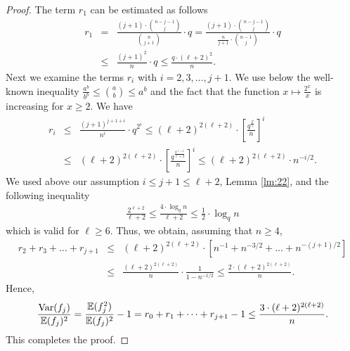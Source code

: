 \documentclass[11pt,twoside, reqno]{amsart}
\theoremstyle{plain}
\theoremstyle{definition}
\newcommand{\E}{\mathbb{E}}
\begin{document}
\begin{proof}
The term $r_1$ can be estimated as follows
\begin{eqnarray*}\label{eq:r1}
r_1&=& \frac{(j+1)\cdot \binom {n-j -1}{j}}{\binom n {j+1} } \cdot q = \frac{(j+1)\cdot \binom {n-j -1}{j}}{\frac{n}{j+1} \cdot \binom {n-1} j  }\cdot q \nonumber \\
&\le & \frac{(j+1)^{2}}{n}\cdot q\le \frac{q\cdot (\ell+2)^{2}}{n}.
\end{eqnarray*}
Next we examine the terms $r_i$ with $i=2, 3, \dots, j+1$. 
We use below the well-known inequality
$
\frac{a^b}{b^b}\le \binom a b\le a^b
$
and the fact that the function $x\mapsto \frac{2^x}{x}$ is increasing for $x\ge 2$. We have
\begin{eqnarray*}
r_i&\le& \frac{(j+1)^{j+1+i}}{n^i}\cdot q^{2^i}
\le (\ell+2)^{2(\ell+2)}\cdot \left[\frac{q^{\frac{2^i}{i}}}{n}\right]^i \\
&\le & (\ell+2)^{2(\ell+2)}\cdot \left[\frac{q^{\frac{2^{\ell+2}}{\ell+2}}}{n}\right]^i 
\le  
(\ell+2)^{2(\ell+2)}\cdot n^{-i/2}.
\end{eqnarray*}
We used above our assumption $i\le j+1\le \ell+2$, Lemma \ref{lm:22}, and the following inequality 
\begin{eqnarray*}\label{eq:beta-1}
\frac{2^{\ell+2}}{\ell+2}\le  \frac{4\cdot\log_q n}{\ell+2} \le 
\frac{1}{2}\cdot \log_qn
\end{eqnarray*}
which is valid for $\ell\ge 6$. 
Thus, we obtain, assuming that $n\ge 4$, 
\begin{eqnarray*}
r_2+r_3+\dots+r_{j+1} &\le & (\ell+2)^{2(\ell+2)}\cdot \left[n^{-1}+n^{-3/2}+\dots+n^{-(j+1)/2}\right]\nonumber \\
&\le& \frac{(\ell+2)^{2(\ell+2)}}{n}\cdot \frac{1}{1-n^{-1/2}}\le \frac{2\cdot (\ell+2)^{2(\ell+2)}}{n}.\label{eq:ri}
\end{eqnarray*}
Hence, 
$$
\frac{{{\rm {Var}}(f_j)}}{\mathbb E(f_j)^2}=\frac{\E(f_j^2)}{\E(f_j)^2} -1 = r_0+r_1+\dots+r_{j+1}-1 \le \frac{3\cdot (\ell+2)^{2(\ell+2)}}{n}.
$$
This completes the proof. 
\end{proof}
\end{document}
